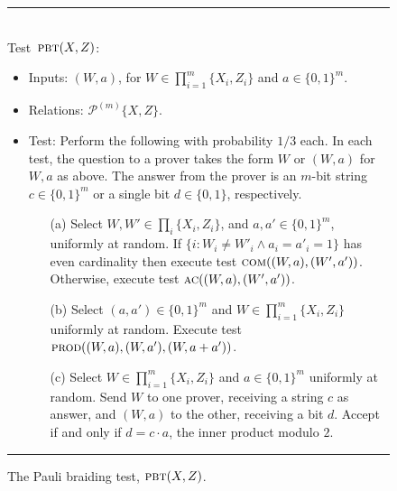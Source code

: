 \documentclass{toc}
\newcommand{\pbt}{\textsc{pbt}}
\newcommand{\prodt}{\textsc{prod}}
\newcommand{\comt}{\textsc{com}}
\newcommand{\act}{\textsc{ac}}
\newcommand{\paulin}{\mathcal{P}^{(m)}\!}
\begin{document}
\begin{figure}[H]
\rule[1ex]{\textwidth}{0.5pt}\\
\justifying
Test~$\pbt(X,Z)$: \begin{itemize}
\item Inputs: $(W,a)$, for $W\in\prod_{i=1}^m\{X_i,Z_i\}$ and $a\in\{0,1\}^m$.
\item Relations: $\paulin\{X,Z\}$.  
\item Test: Perform the following with probability $1/3$ each. In each test, the question to a prover takes the form $W$ or $(W,a)$ for $W,a$ as above. The answer from the prover is an $m$-bit string $c\in\{0,1\}^m$ or a single bit $d\in\{0,1\}$, respectively.  %
\begin{enumerate}
\item[(a)] Select $W,W'\in \prod_i \{X_i,Z_i\}$, and $a,a'\in\{0,1\}^m$, uniformly at random. If $\{i: W_i\neq W'_i \wedge a_i=a'_i=1\}$ has even cardinality then execute test $\comt((W,a),(W',a'))$. Otherwise, execute test $\act((W,a),(W',a'))$. 
\item[(b)] Select $(a,a')\in\{0,1\}^m$ and $W\in\prod_{i=1}^m\{X_i,Z_i\}$ uniformly at random. Execute test $\prodt((W,a),(W,a'),(W,a+a'))$. 
\item[(c)] Select $W\in\prod_{i=1}^m\{X_i,Z_i\}$ and $a\in\{0,1\}^m$ uniformly at random. Send $W$ to one prover, receiving a string $c$ as answer, and $(W,a)$ to the other, receiving a bit $d$. Accept if and only if $d=c\cdot a$, the inner product modulo $2$.  
\end{enumerate}
\end{itemize}
\rule[2ex]{\textwidth}{0.5pt}\vspace{-.5cm}
\caption{The Pauli braiding test, $\pbt(X,Z)$.}
\label{fig:pbt}
\end{figure}
\end{document}
